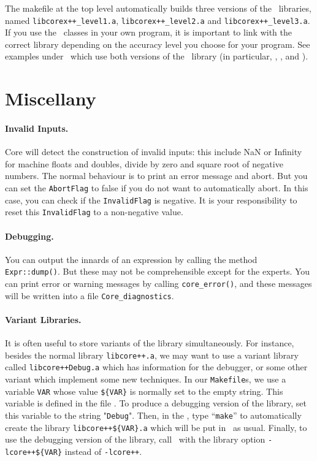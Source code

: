 \documentclass[12pt]{article}
\begin{document}
The makefile at the top level automatically
builds three versions of the \corex\ libraries,
named {\tt libcorex++\_level1.a},
{\tt libcorex++\_level2.a} and {\tt libcorex++\_level3.a}. 
If you use the \corex\ classes in your own program,
it is important to link
with the correct library depending on the accuracy
level you choose for your program.  
See examples under \examplesdir\ which
use both versions of the \corex\ library
(in particular, ,
, and ).

\section{Miscellany}

\paragraph{Invalid Inputs.}
Core will detect the construction of invalid inputs:
this include NaN or Infinity for machine floats and doubles,
divide by zero and square root of negative numbers.
The normal behaviour is to print an error message and abort.
But you can set the \texttt{AbortFlag} to false if you
do not want to automatically abort.  In this case, you
can check if the \texttt{InvalidFlag} is negative.
It is your responsibility to reset this \texttt{InvalidFlag}
to a non-negative value.

\paragraph{Debugging.}
You can output the innards of an expression by calling
the method \texttt{Expr::dump()}.  But these may not be comprehensible
except for the experts.
You can print error or warning messages by calling \texttt{core\_error()},
and these messages will be written into a file \texttt{Core\_diagnostics}.

\paragraph{Variant Libraries.}
It is often useful to store variants of the library simultaneously.
For instance, besides the normal library {\tt libcore++.a},
we may want to use
a variant library called {\tt libcore++Debug.a} which has
information for the debugger, or some other variant
which implement some new techniques.
In our {\tt Makefile}s, we use a variable {\tt VAR} whose
value {\tt \$\{VAR\}} is normally set to the empty string.
This variable is defined in the file .
To produce a debugging version of the library, set this
variable to the string "{\tt Debug}".  Then,
in the \srcdir, type ``{\tt make}'' to automatically
create the library {\tt libcore++\$\{VAR\}.a} which will
be put in \libdir\ as usual.  Finally, to use the
debugging version of the library, call \gpp\ with
the library option {\tt -lcore++\$\{VAR\}} instead of {\tt -lcore++}.
\end{document}

